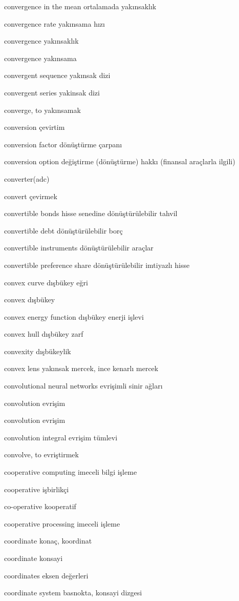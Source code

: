 \documentclass[12pt,fleqn]{article}\usepackage{../../common}
\begin{document}
convergence in the mean ortalamada yakınsaklık

convergence rate yakınsama hızı

convergence yakınsaklık

convergence yakınsama

convergent sequence yakınsak dizi

convergent series yakinsak dizi

converge, to yakınsamak

conversion çevirtim

conversion factor dönüştürme çarpanı

conversion option değiştirme (dönüştürme) hakkı (finansal araçlarla ilgili)

converter(adc)

convert çevirmek

convertible bonds hisse senedine dönüştürülebilir tahvil

convertible debt dönüştürülebilir borç

convertible instruments dönüştürülebilir araçlar

convertible preference share dönüştürülebilir imtiyazlı hisse

convex curve dışbükey eğri

convex dışbükey

convex energy function dışbükey enerji işlevi

convex hull dışbükey zarf

convexity dışbükeylik

convex lens yakınsak mercek, ince kenarlı mercek

convolutional neural networks evrişimli sinir ağları

convolution evrişim

convolution evrişim

convolution integral evrişim tümlevi

convolve, to evriştirmek

cooperative computing imeceli bilgi işleme

cooperative işbirlikçi

co-operative kooperatif

cooperative processing imeceli işleme

coordinate konaç, koordinat

coordinate konsayi

coordinates eksen değerleri

coordinate system basnokta, konsayi dizgesi
\end{document}

